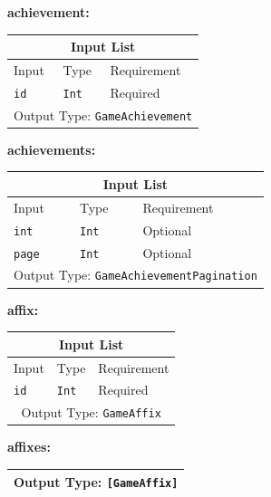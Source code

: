 \documentclass[10pt, a4paper]{memoir}
\numberwithin{equation}{section}
\theoremstyle{plain}
\theoremstyle{defp}
\theoremstyle{dotless}
\theoremstyle{definition}
\theoremstyle{dotless}
\theoremstyle{dotless}
\theoremstyle{defp}
\theoremstyle{defp}
\theoremstyle{be}          %
\theoremstyle{defp}
\newcommand\ttt[1]{\texttt{#1}}
\begin{document}
\textbf{achievement:}

\begin{table}[h!]
	\centering
	\begin{tabular}{ |p{4.2cm}|p{6cm}|p{3cm}|  }
		\hline
		\multicolumn{3}{|c|}{Input List} \\
		\hline
		Input & Type & Requirement\\
		\hline
		\ttt{id} & \ttt{Int} & Required\\
		\hline
		\multicolumn{3}{|c|}{Output Type: \ttt{GameAchievement}} \\
		\hline
	\end{tabular}
\end{table}

\medskip

\textbf{achievements:}

\begin{table}[h!]
	\centering
	\begin{tabular}{ |p{4.2cm}|p{6cm}|p{3cm}|  }
		\hline
		\multicolumn{3}{|c|}{Input List} \\
		\hline
		Input & Type & Requirement\\
		\hline
		\ttt{int} & \ttt{Int} & Optional\\
		\ttt{page} & \ttt{Int} & Optional\\
		\hline
		\multicolumn{3}{|c|}{Output Type: \ttt{GameAchievementPagination}} \\
		\hline
	\end{tabular}
\end{table}

\medskip

\textbf{affix:}

\begin{table}[h!]
	\centering
	\begin{tabular}{ |p{4.2cm}|p{6cm}|p{3cm}|  }
		\hline
		\multicolumn{3}{|c|}{Input List} \\
		\hline
		Input & Type & Requirement\\
		\hline
		\ttt{id} & \ttt{Int} & Required\\
		\hline
		\multicolumn{3}{|c|}{Output Type: \ttt{GameAffix}} \\
		\hline
	\end{tabular}
\end{table}

\medskip

\textbf{affixes:}

\begin{table}[h!]
	\centering
	\begin{tabular}{ |p{4.2cm}|p{6cm}|p{3cm}|  }
		\hline
		\multicolumn{3}{|c|}{Output Type: \ttt{[GameAffix]}} \\
		\hline
	\end{tabular}
\end{table}
\end{document}
